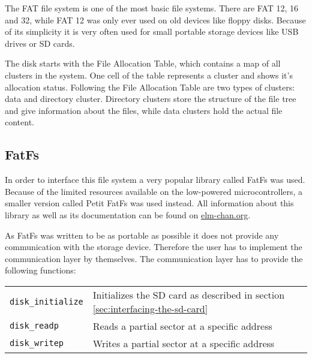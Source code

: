 The FAT file system is one of the most basic file systems. There are FAT 12, 16 and 32, while FAT 12 was only ever used on old devices like floppy disks. Because of its simplicity it is very often used for small portable storage devices like USB drives or SD cards. 

The disk starts with the File Allocation Table, which contains a map of all clusters in the system. One cell of the table represents a cluster and shows it's allocation status. Following the File Allocation Table are two types of clusters: data and directory cluster. Directory clusters store the structure of the file tree and give information about the files, while data clusters hold the actual file content.

\subsection{FatFs}

In order to interface this file system a very popular library called FatFs was used. Because of the limited resources available on the low-powered microcontrollers, a smaller version called Petit FatFs was used instead. All information about this library as well as its documentation can be found on \href{http://elm-chan.org/}{elm-chan.org}.

As FatFs was written to be as portable as possible it does not provide any communication with the storage device. Therefore the user has to implement the communication layer by themselves. %
The communication layer has to provide the following functions:

\begin{tabular}{ll}
    \lstinline[language=C]!disk_initialize! &  Initializes the SD card as described in section \ref{sec:interfacing-the-sd-card}\\
    \lstinline[language=C]!disk_readp! & Reads a partial sector at a specific address\\
    \lstinline[language=C]!disk_writep! & Writes a partial sector at a specific address\\
\end{tabular}

